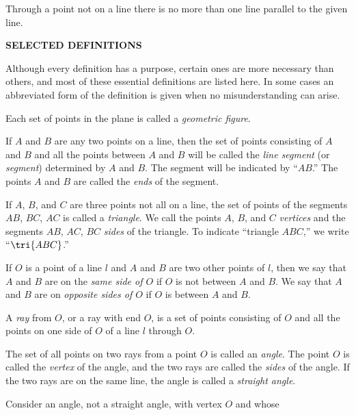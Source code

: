 \documentclass[11pt]{book}
\theoremstyle{bkplain}
\theoremstyle{XIplainnote}
\theoremstyle{bkplain}
\theoremstyle{bkplain}
\newcommand{\APPhead}[2]{%
  \par\bigskip\begin{center}\bfseries #1\end{center}%
  \addcontentsline{toc}{section}{#2}\par\nopagebreak\medskip}
\begin{document}
\begin{applist}[resume]
\item Through a point not on a line there is no more than one line parallel
      to the given line.
\end{applist}

\APPhead{SELECTED DEFINITIONS}{Selected Definitions}

Although every definition has a purpose, certain ones are more necessary
than others, and most of these essential definitions are listed here. In
some cases an abbreviated form of the definition is given when no
misunderstanding can arise.

\begin{applist}
\item Each set of points in the plane is called a \emph{geometric figure}.
\item If $A$ and $B$ are any two points on a line, then the set of points
      consisting of $A$ and $B$ and all the points between $A$ and $B$ will
      be called the \emph{line segment} (or \emph{segment}) determined by
      $A$ and $B$. The segment will be indicated by ``$AB$.'' The points
      $A$ and $B$ are called the \emph{ends} of the segment.
\item If $A$, $B$, and $C$ are three points not all on a line, the set of
      points of the segments $AB$, $BC$, $AC$ is called a \emph{triangle}.
      We call the points $A$, $B$, and $C$ \emph{vertices} and the segments
      $AB$, $AC$, $BC$ \emph{sides} of the triangle. To indicate ``triangle
      $ABC$,'' we write ``$\tri{ABC}$.''
\item If $O$ is a point of a line $l$ and $A$ and $B$ are two other points
      of $l$, then we say that $A$ and $B$ are on the \emph{same side of
      $O$} if $O$ is not between $A$ and $B$. We say that $A$ and $B$ are on
      \emph{opposite sides of $O$} if $O$ is between $A$ and $B$.
\item A \emph{ray} from $O$, or a ray with end $O$, is a set of
      points consisting of $O$ and all the points on one side of $O$ of a
      line $l$ through $O$.
\item The set of all points on two rays from a point $O$ is called an
      \emph{angle}. The point $O$ is called the \emph{vertex} of the angle,
      and the two rays are called the \emph{sides} of the angle. If the two
      rays are on the same line, the angle is called a \emph{straight
      angle}.
\item Consider an angle, not a straight angle, with vertex $O$ and whose

\end{applist}
\end{document}
